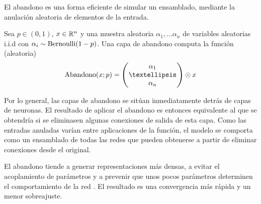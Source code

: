 El abandono es una forma eficiente de simular un ensamblado, mediante la anulación aleatoria de elementos de la entrada. 
\begin{definition}
    Sea \( p \in (0, 1) \), \( x \in \mathbb{R}^{n} \) y  una muestra aleatoria \( \alpha_{1}, … \alpha_{n} \) de variables aleatorias i.i.d con \( \alpha_{i} \sim \operatorname{Bernoulli}(1-p) \). Una capa de abandono computa la función (aleatoria)
    \[
        \dropout(x; p) = \begin{pmatrix} \alpha_{1} \\
        … \\
        \alpha_{n}
        \end{pmatrix} \odot x
    \]
\end{definition}

Por lo general, las capas de abandono se sitúan inmediatamente detrás de capas de neuronas. El resultado de aplicar el abandono es entonces equivalente al que se obtendría si se eliminasen algunas conexiones de salida de esta capa. Como las entradas anuladas varían entre aplicaciones de la función, el modelo se comporta como un ensamblado  de todas las redes que pueden obtenerse a partir de eliminar conexiones desde el original.

El abandono tiende a generar representaciones más densas, a evitar el acoplamiento de parámetros y a prevenir que unos pocos parámetros determinen el comportamiento de la red \cite{srivastava2014dropout}. El resultado es una convergencia más rápida y un menor sobreajuste. 